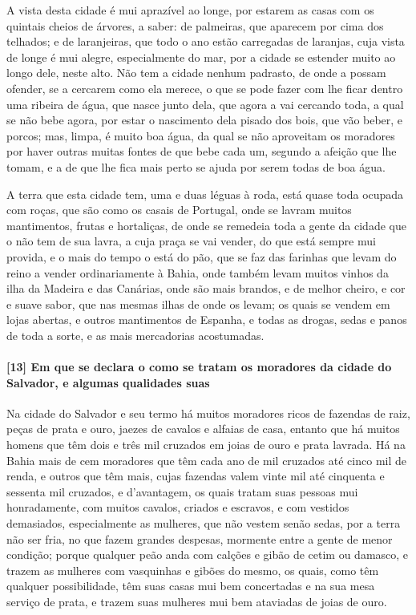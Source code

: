 \begin{linenumbers}
A vista desta cidade é mui aprazível ao longe, por estarem as casas com os quintais cheios
de árvores, a saber: de palmeiras, que aparecem por cima dos telhados; e de laranjeiras,
que todo o ano estão carregadas de laranjas, cuja vista de longe é mui alegre,
especialmente do mar, por a cidade se estender muito ao longo dele, neste alto. Não tem a
cidade nenhum padrasto, de onde a possam ofender, se a cercarem como ela merece, o que se
pode fazer com lhe ficar dentro uma ribeira de água, que nasce junto dela, que agora a vai
cercando toda, a qual se não bebe agora, por estar o nascimento dela pisado dos bois, que
vão beber, e porcos; mas, limpa, é muito boa água, da qual se não aproveitam os moradores
por haver outras muitas fontes de que bebe cada um, segundo a afeição que lhe tomam, e a
de que lhe fica mais perto se ajuda por serem todas de boa água.

A terra que esta cidade tem, uma e duas léguas à roda, está quase toda ocupada com roças,
que são como os casais de Portugal, onde se lavram muitos mantimentos, frutas e
hortaliças, de onde se remedeia toda a gente da cidade que o não tem de sua lavra, a cuja
praça se vai vender, do que está sempre mui provida, e o mais do tempo o está do pão, que
se faz das farinhas que levam do reino a vender ordinariamente à Bahia, onde também levam
muitos vinhos da ilha da Madeira e das Canárias, onde são mais brandos, e de melhor
cheiro, e cor e suave sabor, que nas mesmas ilhas de onde os levam; os quais se vendem em
lojas abertas, e outros mantimentos de Espanha, e todas as drogas, sedas e panos de toda a
sorte, e as mais mercadorias acostumadas.

\paragraph{[13] Em que se declara o como se tratam os moradores da cidade do Salvador, e
algumas qualidades suas} \quad
Na cidade do Salvador e seu termo há muitos moradores ricos de fazendas de raiz, peças de
prata e ouro, jaezes de cavalos e alfaias de casa, entanto que há muitos homens que têm
dois e três mil cruzados em joias de ouro e prata lavrada. Há na Bahia mais de cem
moradores que têm cada ano de mil cruzados até cinco mil de renda, e outros que têm mais,
cujas fazendas valem vinte mil até cinquenta e sessenta mil cruzados, e d'avantagem, os
quais tratam suas pessoas mui honradamente, com muitos cavalos, criados e escravos, e com
vestidos demasiados, especialmente as mulheres, que não vestem senão sedas, por a terra
não ser fria, no que fazem grandes despesas, mormente entre a gente de menor condição;
porque qualquer peão anda com calções e gibão de cetim ou damasco, e trazem as mulheres
com vasquinhas e gibões do mesmo, os quais, como têm qualquer possibilidade, têm suas
casas mui bem concertadas e na sua mesa serviço de prata, e trazem suas mulheres mui bem
ataviadas de joias de ouro.


\end{linenumbers}
